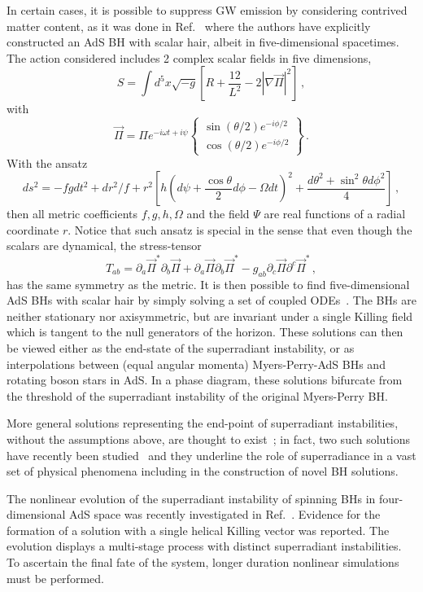 \documentclass[11pt]{article}
\newcommand{\be}{\begin{equation}}
\newcommand{\ee}{\end{equation}}
\numberwithin{equation}{section} %
\begin{document}
In certain cases, it is possible to suppress GW emission by considering contrived matter content, as it was done in Ref.~\cite{Dias:2011at} where the authors have explicitly constructed
an AdS BH with scalar hair, albeit in five-dimensional spacetimes. The action considered includes 2 complex scalar fields in five dimensions,
%
\be
S=\int d^5 x \sqrt{-g}\left[R+\frac{12}{L^2}-2\left|\nabla \vec{\Pi}\right|^2\right]\,,
\ee
%
with
%
\be
\vec{\Pi}=\Pi e^{-i\omega t+i\psi}\left\{ 
\begin{array}{l}
             \sin{\left(\theta/2\right)}e^{-i\phi/2}\\
             \cos{\left(\theta/2\right)}e^{-i\phi/2}
\end{array}
\right\}\,.
\ee
%
With the ansatz
%
\be
ds^2=-fgdt^2+dr^2/f+r^2\left[h\left(d\psi+\frac{\cos\theta}{2}d\phi-\Omega dt\right)^2+\frac{d\theta^2+\sin^2\theta d\phi^2}{4}\right]\,,
\ee
%
then all metric coefficients $f,g,h,\Omega$ and the field $\Psi$ are real functions of a radial coordinate $r$.
Notice that such ansatz is special in the sense that even though the scalars are dynamical, the stress-tensor
%
\be
T_{ab}=\partial_a \vec{\Pi}^*\partial_b\vec{\Pi}+\partial_a \vec{\Pi}\partial_b\vec{\Pi}^*-g_{ab}\partial_c\vec{\Pi}\partial^c\vec{\Pi}^*\,,
\ee
%
has the same symmetry as the metric. It is then possible to find five-dimensional AdS BHs with scalar hair by simply solving a set of coupled ODEs~\cite{Dias:2011at}. The BHs are neither
stationary nor axisymmetric, but are invariant under a single Killing field which is tangent
to the null generators of the horizon. These solutions can then be viewed either as the end-state of
the superradiant instability, or as interpolations between (equal angular momenta) Myers-Perry-AdS BHs and rotating boson stars in AdS.
In a phase diagram, these solutions bifurcate from the threshold of the superradiant instability of the original Myers-Perry BH.


More general solutions representing the end-point of superradiant instabilities, without the assumptions above, are thought to exist~\cite{Cardoso:2006wa,Cardoso:2009nz}; in fact, two such solutions have recently been studied~\cite{Iizuka:2015vsa,Dias:2015rxy} and they underline the role of superradiance in a vast set of physical phenomena including in the construction of novel BH solutions.


The nonlinear evolution of the superradiant instability of spinning BHs in four-dimensional AdS space was recently 
investigated in Ref.~\cite{Chesler:2018txn,Ishii:2020muv}. Evidence for the formation of a solution with a single 
helical Killing vector was reported. The evolution displays a multi-stage process with distinct superradiant 
instabilities. To ascertain the final fate of the system, longer duration nonlinear simulations must be performed.
\end{document}
